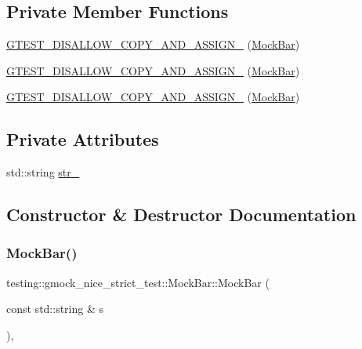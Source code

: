 \subsection*{Private Member Functions}
\begin{DoxyCompactItemize}
\item 
\mbox{\hyperlink{classtesting_1_1gmock__nice__strict__test_1_1_mock_bar_a1ef258ca8798de4e234bb7180123d9d9}{G\+T\+E\+S\+T\+\_\+\+D\+I\+S\+A\+L\+L\+O\+W\+\_\+\+C\+O\+P\+Y\+\_\+\+A\+N\+D\+\_\+\+A\+S\+S\+I\+G\+N\+\_\+}} (\mbox{\hyperlink{classtesting_1_1gmock__nice__strict__test_1_1_mock_bar}{Mock\+Bar}})
\item 
\mbox{\hyperlink{classtesting_1_1gmock__nice__strict__test_1_1_mock_bar_a1ef258ca8798de4e234bb7180123d9d9}{G\+T\+E\+S\+T\+\_\+\+D\+I\+S\+A\+L\+L\+O\+W\+\_\+\+C\+O\+P\+Y\+\_\+\+A\+N\+D\+\_\+\+A\+S\+S\+I\+G\+N\+\_\+}} (\mbox{\hyperlink{classtesting_1_1gmock__nice__strict__test_1_1_mock_bar}{Mock\+Bar}})
\item 
\mbox{\hyperlink{classtesting_1_1gmock__nice__strict__test_1_1_mock_bar_a1ef258ca8798de4e234bb7180123d9d9}{G\+T\+E\+S\+T\+\_\+\+D\+I\+S\+A\+L\+L\+O\+W\+\_\+\+C\+O\+P\+Y\+\_\+\+A\+N\+D\+\_\+\+A\+S\+S\+I\+G\+N\+\_\+}} (\mbox{\hyperlink{classtesting_1_1gmock__nice__strict__test_1_1_mock_bar}{Mock\+Bar}})
\end{DoxyCompactItemize}
\subsection*{Private Attributes}
\begin{DoxyCompactItemize}
\item 
std\+::string \mbox{\hyperlink{classtesting_1_1gmock__nice__strict__test_1_1_mock_bar_a85f45e803ada9ce176b021c1be95e4ca}{str\+\_\+}}
\end{DoxyCompactItemize}


\subsection{Constructor \& Destructor Documentation}
\mbox{\label{classtesting_1_1gmock__nice__strict__test_1_1_mock_bar_abd4e7936dc389201ce608257f7a02584}} 
\subsubsection{\texorpdfstring{MockBar()}{MockBar()}\hspace{0.1cm}{\footnotesize\ttfamily [1/6]}}
{\footnotesize\ttfamily testing\+::gmock\+\_\+nice\+\_\+strict\+\_\+test\+::\+Mock\+Bar\+::\+Mock\+Bar (\begin{DoxyParamCaption}\item[{const std\+::string \&}]{s }\end{DoxyParamCaption})\hspace{0.3cm}{\ttfamily [inline]}, {\ttfamily [explicit]}}

